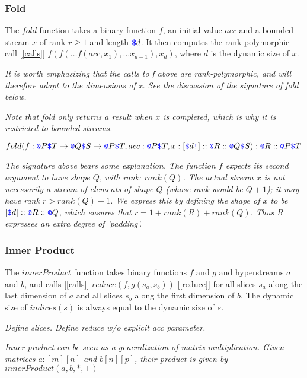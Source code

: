 \documentclass{article}
\begin{document}
\subsubsection{Fold}
\label{fold}


The $fold$ function takes a binary function $f$, an initial value $acc$ and a bounded stream $x$ of rank $r \ge 1$ and length $\texttt{\color{blue} \$}{}d$. It then computes the rank-polymorphic call [\ref{calls}]
$f(f( \ldots f(acc, x_1), \ldots x_{d-1}), x_d)$, where $d$ is the dynamic size of $x$.

{\em It is worth emphasizing that the calls to f above are rank-polymorphic, and will therefore adapt to the dimensions of x. See the discussion of the signature of fold below.
}

{\em Note that fold only returns a result when $x$ is completed, which is why it is restricted to bounded streams.}

$fold(f: \texttt{\color{blue} @}{}P\texttt{\color{blue} \$}{}T \to{}\texttt{\color{blue} @}{}Q\texttt{\color{blue} \$}{}S \to{}\texttt{\color{blue} @}{}P\texttt{\color{blue} \$}{}T, acc: \texttt{\color{blue} @}{}P\texttt{\color{blue} \$}{}T, x:[\texttt{\color{blue} \$}{}d\texttt{\color{blue} !}]::\texttt{\color{blue} @}{}R::\texttt{\color{blue} @}{}Q \texttt{\color{blue} \$}{}S): \texttt{\color{blue} @}{}R::\texttt{\color{blue} @}{}P \texttt{\color{blue} \$}{}T $

{\em
The signature above bears some explanation. The function $f$ expects its second argument to have shape $Q$, with rank: $rank(Q)$. The actual stream $x$ is not necessarily a stream of elements of shape $Q$ (whose rank would be $Q+1$); it may have rank $r \gt rank(Q) + 1$. We express this by defining the shape of $x$ to be $[\texttt{\color{blue} \$}{}d]::\texttt{\color{blue} @}{}R::\texttt{\color{blue} @}{}Q$, which ensures that $r = 1 + rank(R) + rank(Q)$. Thus $R$ expresses an extra degree of 'padding'.
}

\subsubsection{Inner Product}
\label{innerProduct}

The $innerProduct$ function takes binary functions $f$ and $g$ and hyperstreams $a$ and $b$, and calls [\ref{calls}] $reduce(f, g(s_a, s_b))$ [\ref{reduce}] for all slices $s_a$ along the last dimension of  $a$ and all slices  $s_b$ along the first dimension of $b$. The dynamic size  of $indices(s)$ is  always equal to the dynamic size of $s$.


{\em Define slices. Define reduce w/o explicit acc parameter.}

{\em Inner product can be seen as a generalization of matrix multiplication.  Given matrices $a: [m][n]$ and $b[n][p]$, their product is given by
 $innerProduct(a, b, *, +)$

}
\end{document}
